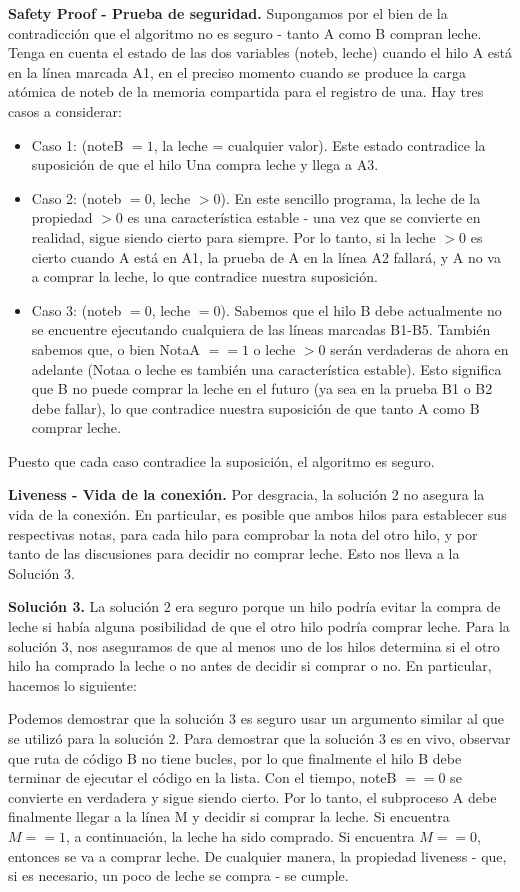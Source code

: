 \documentclass[10pt]{book}
\begin{document}
\textbf{Safety Proof - Prueba de seguridad.} Supongamos por el bien de la contradicción que el algoritmo no es seguro - tanto A como B compran leche. Tenga en cuenta el estado de las dos variables (noteb, leche) cuando el hilo A está en la línea marcada A1, en el preciso momento cuando se produce la carga atómica de noteb de la memoria compartida para el registro de una. Hay tres casos a considerar:
\begin{itemize}
\item Caso 1: (noteB $= 1$, la leche = cualquier valor). Este estado contradice la suposición de que el hilo Una compra leche y llega a A3.
\item Caso 2: (noteb $= 0$, leche $> 0$). En este sencillo programa, la leche de la propiedad $> 0$ es una característica estable - una vez que se convierte en realidad, sigue siendo cierto para siempre. Por lo tanto, si la leche $> 0$ es cierto cuando A está en A1, la prueba de A en la línea A2 fallará, y A no va a comprar la leche, lo que contradice nuestra suposición.
\item Caso 3: (noteb $= 0$, leche $= 0$). Sabemos que el hilo B debe actualmente no se encuentre ejecutando cualquiera de las líneas marcadas B1-B5. También sabemos que, o bien NotaA $== 1$ o leche $> 0$ serán verdaderas de ahora en adelante (Notaa o leche es también una característica estable). Esto significa que B no puede comprar la leche en el futuro (ya sea en la prueba B1 o B2 debe fallar), lo que contradice nuestra suposición de que tanto A como B comprar leche.
\end{itemize}

Puesto que cada caso contradice la suposición, el algoritmo es seguro.

\textbf{Liveness - Vida de la conexión.} Por desgracia, la solución 2 no asegura la vida de la conexión. En particular, es posible que ambos hilos para establecer sus respectivas notas, para cada hilo para comprobar la nota del otro hilo, y por tanto de las discusiones para decidir no comprar leche. Esto nos lleva a la Solución 3.

\textbf{Solución 3.} La solución $2$ era seguro porque un hilo podría evitar la compra de leche si había alguna posibilidad de que el otro hilo podría comprar leche. Para la solución $3$, nos aseguramos de que al menos uno de los hilos determina si el otro hilo ha comprado la leche o no antes de decidir si comprar o no. En particular, hacemos lo siguiente:

Podemos demostrar que la solución $3$ es seguro usar un argumento similar al que se utilizó para la solución $2$. Para demostrar que la solución $3$ es en vivo, observar que ruta de código B no tiene bucles, por lo que finalmente el hilo B debe terminar de ejecutar el código en la lista. Con el tiempo, noteB $== 0$ se convierte en verdadera y sigue siendo cierto. Por lo tanto, el subproceso A debe finalmente llegar a la línea M y decidir si comprar la leche. Si encuentra $M == 1$, a continuación, la leche ha sido comprado. Si encuentra $M == 0$, entonces se va a comprar leche. De cualquier manera, la propiedad liveness - que, si es necesario, un poco de leche se compra - se cumple.
\end{document}
